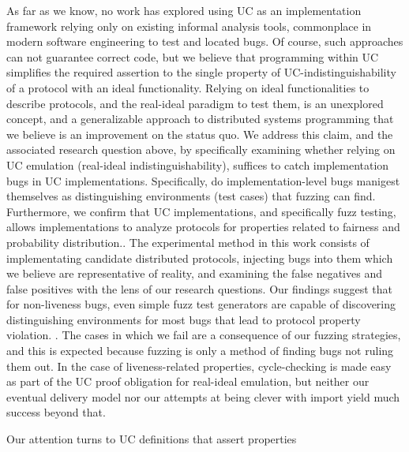 As far as we know, no work has explored using UC as an implementation framework relying only on existing informal analysis tools, commonplace in modern software engineering to test and located bugs. 
Of course, such approaches can not guarantee correct code, but we believe that programming within UC simplifies the required assertion to the single property of UC-indistinguishability of a protocol with an ideal functionality.
Relying on ideal functionalities to describe protocols, and the real-ideal paradigm to test them, is an unexplored concept, and a generalizable approach to distributed systems programming that we believe is an improvement on the status quo.
We address this claim, and the associated research question above, by specifically examining whether relying on UC emulation (real-ideal indistinguishability), suffices to catch implementation bugs in UC implementations. 
Specifically, do implementation-level bugs manigest themselves as distinguishing environments (test cases) that fuzzing can find.
Furthermore, we confirm that UC implementations, and specifically fuzz testing, allows implementations to analyze protocols for properties related to fairness and probability distribution..
The experimental method in this work consists of implementating candidate distributed protocols, injecting bugs into them which we believe are representative of reality, and examining the false negatives and false positives with the lens of our research questions.
Our findings suggest that for non-liveness bugs, even simple fuzz test generators are capable of discovering distinguishing environments for most bugs that lead to protocol property violation.
.
The cases in which we fail are a consequence of our fuzzing strategies, and this is expected because fuzzing is only a method of finding bugs not ruling them out.
In the case of liveness-related properties, cycle-checking is made easy as part of the UC proof obligation for real-ideal emulation, but neither our eventual delivery model nor our attempts at being clever with import yield much success beyond that. 

Our attention turns to UC definitions that assert properties  

